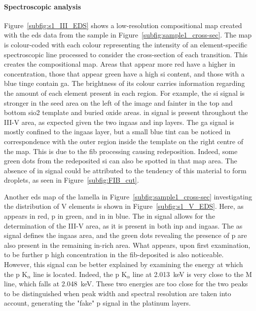 \paragraph{Spectroscopic analysis}Figure~\ref{subfig:s1_III_EDS} shows a low-resolution compositional map created with the \acf{eds} data from the sample in Figure~\ref{subfig:sample1_cross-sec}. The map is colour-coded with each colour representing the intensity of an element-specific spectroscopic line processed to consider the cross-section of each transition. This creates the compositional map. Areas that appear more red have a higher \acl{in} concentration, those that appear green have a high \acs{si} content, and those with a blue tinge contain \acl{ga}. The brightness of its colour carries information regarding the amount of each element present in each region. For example, the \acs{si} signal is stronger in the seed area on the left of the image and fainter in the top and bottom \acs{sio2} template and buried oxide areas. \Acl{in} signal is present throughout the III-V area, as expected given the two \acs{ingaas} and \acs{inp} layers. The \acl{ga} signal is mostly confined to the \acs{ingaas} layer, but a small blue tint can be noticed in correspondence with the outer  region inside the template on the right centre of the map. This is due to the \acs{fib} processing causing redeposition. Indeed, some green dots from the redeposited \acl{si} can also be spotted in that map area. The absence of \acl{in} signal could be attributed to the tendency of this material to form droplets, as seen in Figure~\ref{subfig:FIB_cut}.
\par
Another \acs{eds} map of the lamella in Figure~\ref{subfig:sample1_cross-sec} investigating the distribution of V elements is shown in Figure~\ref{subfig:s1_V_EDS}. Here, \acl{as} appears in red, \acl{p} in green, and \acl{in} in blue. The \acl{in} signal allows for the determination of the III-V area, as it is present in both \acs{inp} and \acs{ingaas}. The \acl{as} signal defines the \acs{ingaas} area, and the green dots revealing the presence of \acl{p} are also present in the remaining \acs{in}-rich area. What appears, upon first examination, to be further \acl{p} high concentration in the \acs{fib}-deposited  is also noticeable. However, this signal can be better explained by examining the energy at which the \acl{p} K\(_\alpha\) line is located. Indeed, the \acs{p} K\(_\alpha\) line at \qty{2.013}{\kilo\eV} is very close to the  M line, which falls at \qty{2.048}{\kilo\eV}. These two energies are too close for the two peaks to be distinguished when peak width and spectral resolution are taken into account, generating the "fake" \acl{p} signal in the platinum layers.
\par
